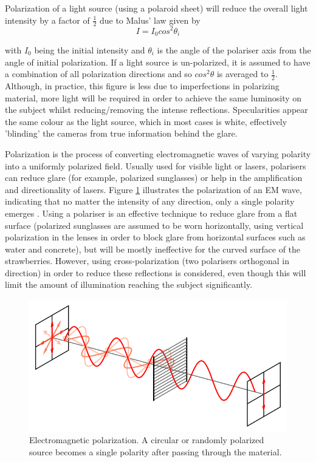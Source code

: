 \documentclass[fleqn,twoside,12pt]{report}
\begin{document}
Polarization of a light source (using a polaroid sheet) will reduce the overall light intensity by a factor of $\frac{1}{2}$ due to Malus' law given by
\begin{equation}
I = I_{0} cos^{2}\theta_{i}
\end{equation}

with $I_{0}$ being the initial intensity and $\theta_{i}$ is the angle of the polariser axis from the angle of initial polarization. If a light source is un-polarized, it is assumed to have a combination of all polarization directions and so $cos^{2}\theta$ is averaged to $\frac{1}{2}$. Although, in practice, this figure is less due to imperfections in polarizing material, more light will be required in order to achieve the same luminosity on the subject \cite{rox, sommer} whilst reducing/removing the intense reflections. Specularities appear the same colour as the light source, which in most cases is white, effectively 'blinding' the cameras from true information behind the glare.  


Polarization is the process of converting electromagnetic waves of varying polarity into a uniformly polarized field. Usually used for visible light or lasers, polarisers can reduce glare (for example, polarized sunglasses) or help in the amplification and directionality of lasers. Figure \ref{fig:polarization} illustrates the polarization of an EM wave, indicating that no matter the intensity of any direction, only a single polarity emerges  \cite{physicsopenlab}. Using a polariser is an effective technique to reduce glare from a flat surface (polarized sunglasses are assumed to be worn horizontally, using vertical polarization in the lenses in order to block glare from horizontal surfaces such as water and concrete), but will be mostly ineffective for the curved surface of the strawberries. However, using cross-polarization (two polarisers orthogonal in direction) in order to reduce these reflections is considered, even though this will limit the amount of illumination reaching the subject significantly.

\begin{figure}[h]
	\centering
	\includegraphics[width=.8\linewidth]{polarization.png}
	\caption{Electromagnetic polarization. A circular or randomly polarized source becomes a single polarity after passing through the material.}
	\label{fig:polarization}
\end{figure}%
\end{document}
